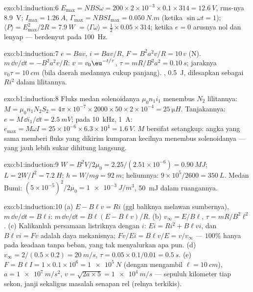 \begin{solution}{exo:b1:induction:6}
$E_{\max} = NBS\omega = 200 \times 2 \times 10^{-3} \times 0.1 \times 314 = \qty{12.6}{V}$, rms-nya
\qty{8.9}{V}; $I_{\max} = \qty{1.26}{A}$, $\Gamma_{\max} = NBSI_{\max} = \qty{0.050}{N.m}$
(ketika $\sin\omega t = 1$); $\langle P\rangle = E_{\max}^2/2R = \qty{7.9}{W}$ $=
\langle\Gamma\omega\rangle = \tfrac12 \times 0.05 \times 314$; ketika $e = 0$ arusnya
nol dan  lenyap ---  berdenyut pada \qty{100}{Hz}.
\end{solution}

\begin{solution}{exo:b1:induction:7}
$e = Bav$, $i = Bav/R$, $F = B^2a^2v/R = 10\,v$ (N). $m\,\dd v/\dd t = -B^2a^2v/R$:
$v = v_0\eu^{-t/\tau}$, $\tau = mR/B^2a^2 = \qty{0.10}{s}$; jaraknya $v_0\tau =
\qty{10}{cm}$ (bila daerah medannya cukup panjang). ,
\qty{0.5}{J}, dilesapkan sebagai $Ri^2$ dalam lilitannya.
\end{solution}

\begin{solution}{exo:b1:induction:8}
Fluks medan solenoidanya $\mu_0n_1i_1$ menembus $N_2$ lilitannya: $M =
\mu_0n_1N_2S_2 = 4\pi \times 10^{-7} \times 2000 \times 50 \times 2 \times 10^{-4} = \qty{25}{\micro H}$.
Tanjakannya: $e = M\,\dd i_1/\dd t = \qty{2.5}{mV}$; pada \qty{10}{kHz}, \qty{1}{A}: $e_{\max} =
M\omega I = 25 \times 10^{-6} \times 6.3 \times 10^4 = \qty{1.6}{V}$. $M$ bersifat setangkup:
angka yang sama memberi fluks yang dikirim kumparan kecilnya menembus
solenoidanya --- yang jauh lebih sukar dihitung langsung.
\end{solution}

\begin{solution}{exo:b1:induction:9}
$W = B^2V/2\mu_0 = 2.25/(2.51 \times 10^{-6}) = \qty{0.90}{MJ}$; $L = 2W/I^2 =
\qty{7.2}{H}$; $h = W/mg = \qty{92}{m}$; heliumnya: $9 \times 10^5/2600 = \qty{350}{L}$.
Medan Bumi: $(5 \times 10^{-5})^2/2\mu_0 = \qty{1e-3}{J/m^3}$, \qty{50}{mJ} dalam
ruangannya.
\end{solution}

\begin{solution}{exo:b1:induction:10}
(a) $E - B\ell v = Ri$ (ggl baliknya melawan sumbernya), $m\,\dd v/\dd t =
B\ell i$: $m\,\dd v/\dd t = B\ell(E - B\ell v)/R$. (b) $v_\infty = E/B\ell$, $\tau =
mR/B^2\ell^2$. (c) Kalikanlah persamaan listriknya dengan $i$: $Ei = Ri^2 +
B\ell vi$, dan $B\ell vi = Fv$ adalah daya mekanisnya;  $Fv/Ei =
B\ell v/E = v/v_\infty$ --- $100\%$ hanya pada keadaan tanpa beban, yang tak
menyalurkan apa pun. (d) $v_\infty = 2/(0.5 \times 0.2) = \qty{20}{m/s}$, $\tau = 0.05 \times
0.1/0.01 = \qty{0.5}{s}$. (e) $F = B\ell I = 1 \times 0.1 \times 10^6 = \qty{1e5}{N}$
(dengan mengambil $\ell = \qty{10}{cm}$), $a = \qty{1e7}{m/s^2}$, $v = \sqrt{2a \times 5} =
\qty{1e4}{m/s}$ --- sepuluh kilometer tiap sekon, janji sekaligus
masalah senapan rel (relnya terkikis).
\end{solution}

